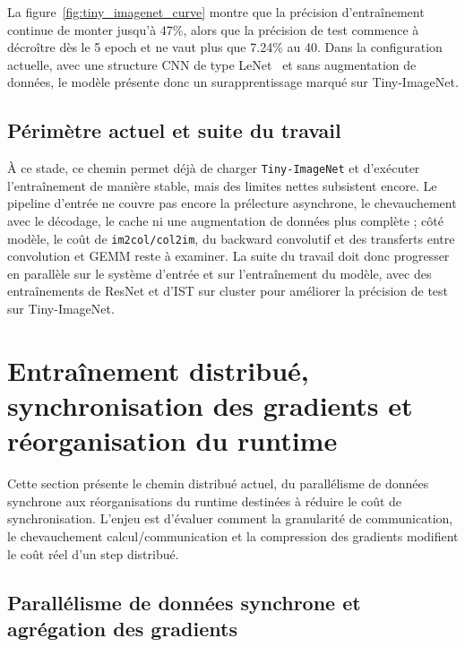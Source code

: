 \documentclass[a4paper,11pt,oneside]{article}
\begin{document}
La figure~\ref{fig:tiny_imagenet_curve} montre que la précision d'entraînement continue de monter jusqu'à 47\%, alors que la précision de test commence à décroître dès le 5\ieme{} epoch et ne vaut plus que 7.24\% au 40\ieme{}. Dans la configuration actuelle, avec une structure CNN de type LeNet~\cite{lecun1998} et sans augmentation de données, le modèle présente donc un surapprentissage marqué sur Tiny-ImageNet.

\subsection{Périmètre actuel et suite du travail}

À ce stade, ce chemin permet déjà de charger \texttt{Tiny-ImageNet} et d'exécuter l'entraînement de manière stable, mais des limites nettes subsistent encore. Le pipeline d'entrée ne couvre pas encore la prélecture asynchrone, le chevauchement avec le décodage, le cache ni une augmentation de données plus complète ; côté modèle, le coût de \texttt{im2col/col2im}, du backward convolutif et des transferts entre convolution et GEMM reste à examiner. La suite du travail doit donc progresser en parallèle sur le système d'entrée et sur l'entraînement du modèle, avec des entraînements de ResNet et d'IST sur cluster pour améliorer la précision de test sur Tiny-ImageNet.

\section{Entraînement distribué, synchronisation des gradients et réorganisation du runtime}

Cette section présente le chemin distribué actuel, du parallélisme de données synchrone aux réorganisations du runtime destinées à réduire le coût de synchronisation. L'enjeu est d'évaluer comment la granularité de communication, le chevauchement calcul/communication et la compression des gradients modifient le coût réel d'un step distribué.

\subsection{Parallélisme de données synchrone et agrégation des gradients}
\end{document}

